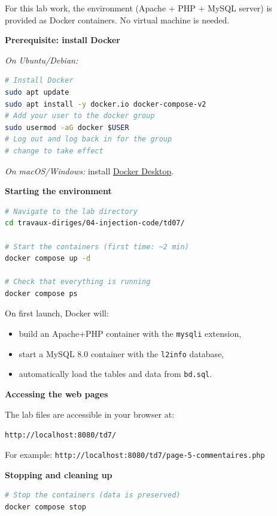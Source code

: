 \documentclass[a4paper,11pt]{article}
\theoremstyle{plain}
\theoremstyle{definition}
\begin{document}
\begin{tcolorbox}[colback=gray!5!white, colframe=gray!60!black, title={Setup with Docker}]
For this lab work, the environment (Apache + PHP + MySQL server) is provided as Docker containers. No virtual machine is needed.

\medskip
\textbf{Prerequisite: install Docker}

\medskip
\textit{On Ubuntu/Debian:}
\begin{lstlisting}[language=bash,numbers=none]
# Install Docker
sudo apt update
sudo apt install -y docker.io docker-compose-v2
# Add your user to the docker group
sudo usermod -aG docker $USER
# Log out and log back in for the group
# change to take effect
\end{lstlisting}

\textit{On macOS/Windows:} install \href{https://www.docker.com/products/docker-desktop/}{Docker Desktop}.

\medskip
\textbf{Starting the environment}

\begin{lstlisting}[language=bash,numbers=none]
# Navigate to the lab directory
cd travaux-diriges/04-injection-code/td07/

# Start the containers (first time: ~2 min)
docker compose up -d

# Check that everything is running
docker compose ps
\end{lstlisting}

On first launch, Docker will:
\begin{itemize}
    \item build an Apache+PHP container with the \texttt{mysqli} extension,
    \item start a MySQL 8.0 container with the \texttt{l2info} database,
    \item automatically load the tables and data from \texttt{bd.sql}.
\end{itemize}

\medskip
\textbf{Accessing the web pages}

The lab files are accessible in your browser at:

\begin{center}
\texttt{http://localhost:8080/td7/}
\end{center}

For example: \texttt{http://localhost:8080/td7/page-5-commentaires.php}

\medskip
\textbf{Stopping and cleaning up}

\begin{lstlisting}[language=bash,numbers=none]
# Stop the containers (data is preserved)
docker compose stop


\end{lstlisting}
\end{tcolorbox}
\end{document}

